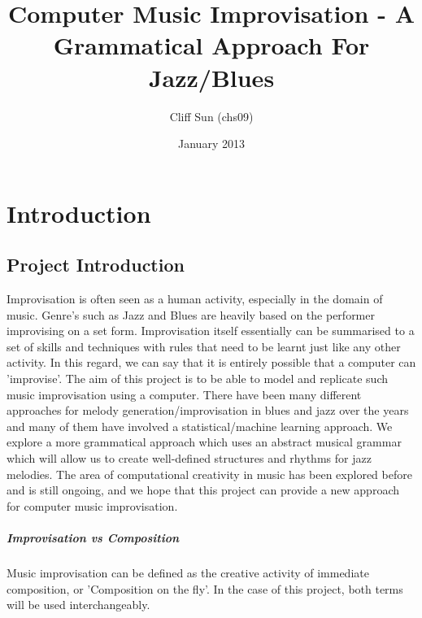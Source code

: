 \documentclass[pdftex,12pt,a4paper]{report}
\begin{document}
\title{Computer Music Improvisation - A Grammatical Approach For Jazz/Blues}
\author{Cliff Sun (chs09)}
\date{January 2013}
\maketitle


\setcounter{tocdepth}{2} %

\tableofcontents

\pagebreak

\renewcommand*\thesection{\arabic{section}}



\pagebreak

\chapter{Introduction}

\section{Project Introduction}
Improvisation is often seen as a human activity, especially in the domain of music. Genre's such as Jazz and Blues are heavily based on the performer improvising on a set form. Improvisation itself essentially can be summarised to a set of skills and techniques with rules that need to be learnt just like any other activity. In this regard, we can say that it is entirely possible that a computer can 'improvise'. The aim of this project is to be able to model and replicate such music improvisation using a computer. There have been many different approaches for melody generation/improvisation in blues and jazz over the years and many of them have involved a statistical/machine learning approach. We explore a more grammatical approach which uses an abstract musical grammar which will allow us to create well-defined structures and rhythms for jazz melodies. The area of computational creativity in music has been explored before and is still ongoing, and we hope that this project can provide a new approach for computer music improvisation.

\paragraph{Improvisation vs Composition}
Music improvisation can be defined as the creative activity of immediate composition, or 'Composition on the fly'. In the case of this project, both terms will be used interchangeably.
\end{document}
